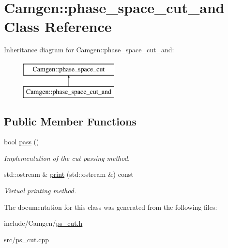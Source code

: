 \hypertarget{a00420}{}\section{Camgen\+:\+:phase\+\_\+space\+\_\+cut\+\_\+and Class Reference}
\label{a00420}
Inheritance diagram for Camgen\+:\+:phase\+\_\+space\+\_\+cut\+\_\+and\+:\begin{figure}[H]
\begin{center}
\leavevmode
\includegraphics[height=2.000000cm]{a00420}
\end{center}
\end{figure}
\subsection*{Public Member Functions}
\begin{DoxyCompactItemize}
\item 
\hypertarget{a00420_aeed92e4545305d02832225caf1063548}{}bool \hyperlink{a00420_aeed92e4545305d02832225caf1063548}{pass} ()\label{a00420_aeed92e4545305d02832225caf1063548}

\begin{DoxyCompactList}\small\item\em Implementation of the cut passing method. \end{DoxyCompactList}\item 
\hypertarget{a00420_ac421003078cd2480bfc6dabc719235b4}{}std\+::ostream \& \hyperlink{a00420_ac421003078cd2480bfc6dabc719235b4}{print} (std\+::ostream \&) const \label{a00420_ac421003078cd2480bfc6dabc719235b4}

\begin{DoxyCompactList}\small\item\em Virtual printing method. \end{DoxyCompactList}\end{DoxyCompactItemize}


The documentation for this class was generated from the following files\+:\begin{DoxyCompactItemize}
\item 
include/\+Camgen/\hyperlink{a00741}{ps\+\_\+cut.\+h}\item 
src/ps\+\_\+cut.\+cpp\end{DoxyCompactItemize}
